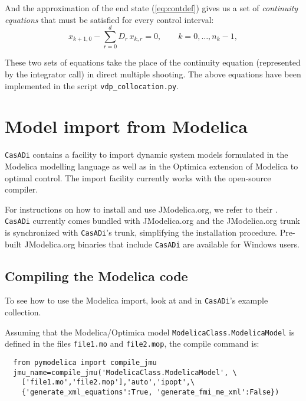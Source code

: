 \documentclass[a4paper,12pt]{book}
\newcommand{\CasADi}{\texttt{CasADi}\xspace}
\begin{document}
And the approximation of the end state (\ref{eq:contdef}) gives us a set of \emph{continuity equations} that must be satisfied for every control interval:
\begin{equation}
x_{k+1,0} - \sum_{r=0}^{d}{D_r \, x_{k,r}} = 0, \qquad k=0,\ldots,n_k-1, 
\end{equation}

These two sets of equations take the place of the continuity equation (represented by the integrator call) in direct multiple shooting. The above equations have been implemented in the script \texttt{vdp\_collocation.py}.

\chapter{Model import from Modelica}\label{sec:modelica}
\CasADi contains a facility to import dynamic system models formulated in the Modelica modelling language as well as in the Optimica extension of Modelica to optimal control. The import facility currently works with the open-source  compiler.

For instructions on how to install and use JModelica.org, we refer to their . \CasADi currently comes bundled with JModelica.org and the JModelica.org trunk is synchronized with \CasADi's trunk, simplifying the installation procedure. Pre-built JModelica.org binaries that include \CasADi are available for Windows users.

\section{Compiling the Modelica code} \label{sec:modelica_compilation}
To see how to use the Modelica import, look at  and  in \CasADi's example collection. 

Assuming that the Modelica/Optimica model \texttt{ModelicaClass.ModelicaModel} is defined in the files \texttt{file1.mo} and \texttt{file2.mop}, the compile command is:
\begin{verbatim}
  from pymodelica import compile_jmu
  jmu_name=compile_jmu('ModelicaClass.ModelicaModel', \
    ['file1.mo','file2.mop'],'auto','ipopt',\
    {'generate_xml_equations':True, 'generate_fmi_me_xml':False})
\end{verbatim}
\end{document}
